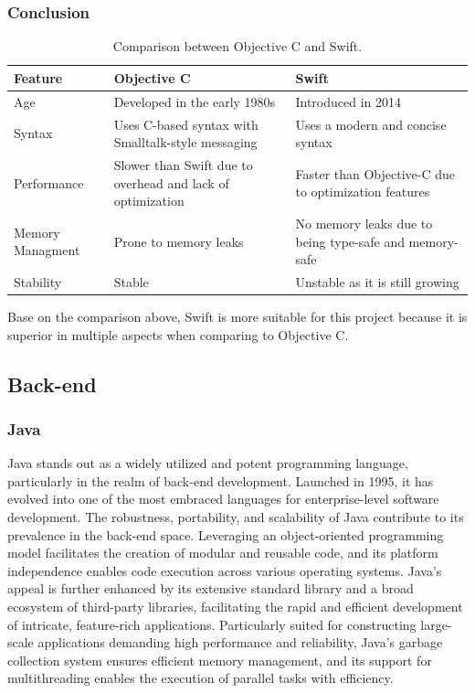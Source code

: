 \subsubsection{Conclusion}

\begin{table}[H]
    \centering
    \begin{tabular}{| >{\centering\arraybackslash}m{2cm} | >{\centering\arraybackslash}m{6cm} | >{\centering\arraybackslash}m{6cm} |}
        \hline
        \textbf{Feature} & \textbf{Objective C} & \textbf{Swift} \\ \hline
        Age & Developed in the early 1980s & Introduced in 2014 \\ \hline
        Syntax & Uses C-based syntax with Smalltalk-style messaging & Uses a modern and concise syntax \\ \hline
        Performance & Slower than Swift due to overhead and lack of optimization & Faster than Objective-C due to optimization features \\ \hline
        Memory Managment & Prone to memory leaks & No memory leaks due to being type-safe and memory-safe \\ \hline
        Stability & Stable & Unstable as it is still growing \\ \hline
    \end{tabular}
    \caption{Comparison between Objective C and Swift.}
\end{table}

Base on the comparison above, Swift is more suitable for this project because it is superior in multiple aspects when comparing to Objective C.

\newpage
\subsection{Back-end}

\subsubsection{Java}

Java stands out as a widely utilized and potent programming language, particularly in the realm of back-end development. Launched in 1995, it has evolved into one of the most embraced languages for enterprise-level software development. The robustness, portability, and scalability of Java contribute to its prevalence in the back-end space. Leveraging an object-oriented programming model facilitates the creation of modular and reusable code, and its platform independence enables code execution across various operating systems. Java's appeal is further enhanced by its extensive standard library and a broad ecosystem of third-party libraries, facilitating the rapid and efficient development of intricate, feature-rich applications. Particularly suited for constructing large-scale applications demanding high performance and reliability, Java's garbage collection system ensures efficient memory management, and its support for multithreading enables the execution of parallel tasks with efficiency.

